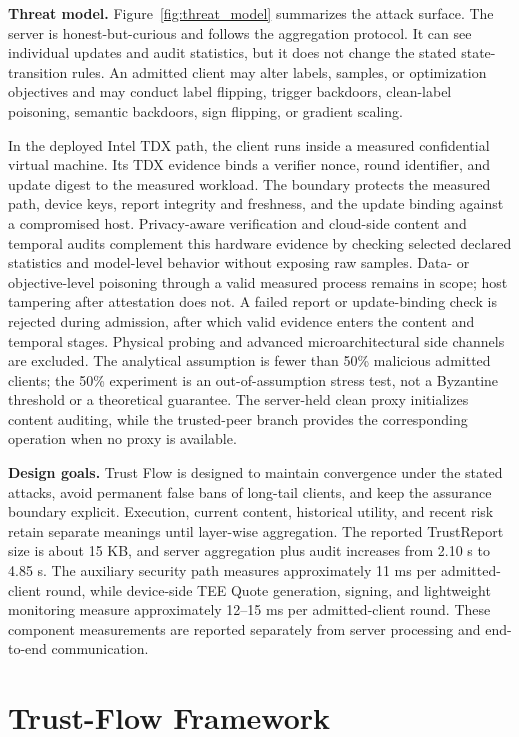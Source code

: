 \documentclass[runningheads,orivec]{llncs}
\begin{document}
\textbf{Threat model.} Figure~\ref{fig:threat_model} summarizes the attack surface. The server is honest-but-curious and follows the aggregation protocol. It can see individual updates and audit statistics, but it does not change the stated state-transition rules. An admitted client may alter labels, samples, or optimization objectives and may conduct label flipping, trigger backdoors, clean-label poisoning, semantic backdoors, sign flipping, or gradient scaling.

In the deployed Intel TDX path, the client runs inside a measured confidential virtual machine. Its TDX evidence binds a verifier nonce, round identifier, and update digest to the measured workload. The boundary protects the measured path, device keys, report integrity and freshness, and the update binding against a compromised host. Privacy-aware verification and cloud-side content and temporal audits complement this hardware evidence by checking selected declared statistics and model-level behavior without exposing raw samples. Data- or objective-level poisoning through a valid measured process remains in scope; host tampering after attestation does not. A failed report or update-binding check is rejected during admission, after which valid evidence enters the content and temporal stages. Physical probing and advanced microarchitectural side channels are excluded. The analytical assumption is fewer than 50\% malicious admitted clients; the 50\% experiment is an out-of-assumption stress test, not a Byzantine threshold or a theoretical guarantee. The server-held clean proxy initializes content auditing, while the trusted-peer branch provides the corresponding operation when no proxy is available.

\textbf{Design goals.} Trust Flow is designed to maintain convergence under the stated attacks, avoid permanent false bans of long-tail clients, and keep the assurance boundary explicit. Execution, current content, historical utility, and recent risk retain separate meanings until layer-wise aggregation. The reported TrustReport size is about 15 KB, and server aggregation plus audit increases from 2.10 s to 4.85 s. The auxiliary security path measures approximately 11 ms per admitted-client round, while device-side TEE Quote generation, signing, and lightweight monitoring measure approximately 12--15 ms per admitted-client round. These component measurements are reported separately from server processing and end-to-end communication.

\section{Trust-Flow Framework}
\end{document}
